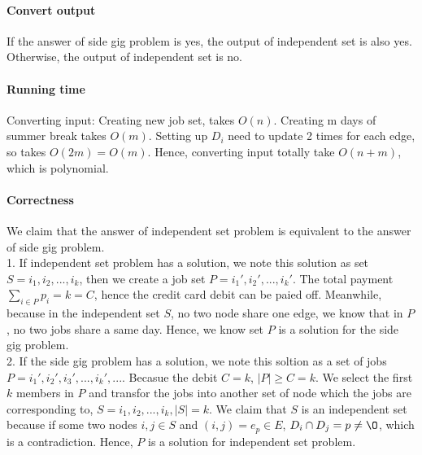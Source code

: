 \documentclass{article}
\begin{document}
	\paragraph{Convert output}
	If the answer of side gig problem is yes, the output of independent set is also yes. Otherwise, the output of independent set is no.
	\paragraph{Running time}
	Converting input: Creating new job set, takes $O(n)$. Creating m days of summer break takes $O(m)$. Setting up ${D_i}$ need to update 2 times for each edge, so takes $O(2m)=O(m)$. Hence, converting input totally take $O(n+m)$, which is polynomial. 
	\paragraph{Correctness}
	We claim that the answer of independent set problem is equivalent to the answer of side gig problem.\\
	1. If independent set problem has a solution, we note this solution as set $S={i_1, i_2,...,i_k}$, then we create a job set $P={i_1',i_2',...,i_k'}$. The total payment $\sum_{i\in P}{p_i}=k=C$, hence the credit card debit can be paied off. Meanwhile, because in the independent set $S$, no two node share one edge, we know that in $P$, no two jobs share a same day. Hence, we know set $P$ is a solution for the side gig problem. \\
	2. If the side gig problem has a solution, we note this soltion as a set of jobs $P={i_1',i_2',i_3',...,i_k',...}$. Becasue the debit $C=k$, $|P|\geq C=k$. We select the first $k$ members in $P$ and transfor the jobs into another set of node which the jobs are corresponding to, $S={i_1,i_2,...,i_k}, |S|=k$. We claim that $S$ is an independent set because if some two nodes $i,j\in S$ and $(i,j)=e_p\in E$, $D_i\cap D_j ={p}\neq \O$, which is a contradiction. Hence, $P$ is a solution for independent set problem. 
\end{document}
